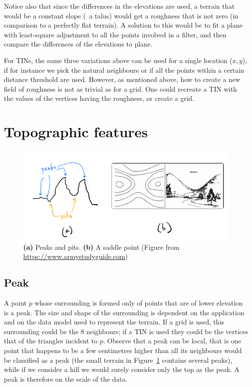 Notice also that since the differences in the elevations are used, a terrain that would be a constant slope (\eg\ a talus) would get a roughness that is not zero (in comparison to a perfectly flat terrain).
A solution to this would be to fit a plane with least-square adjustment to all the points involved in a filter, and then compare the differences of the elevations to plane.

%

For TINs, the same three variations above can be used for a single location ($x,y$), if for instance we pick the natural neighbours or if all the points within a certain distance threshold are used.
However, as mentioned above, how to create a new field of roughness is not as trivial as for a grid.
One could recreate a TIN with the values of the vertices having the roughness, or create a grid.




%
\section{Topographic features}

\begin{figure}
  \centering
  \includegraphics[width=\linewidth]{figs/feature_points}
  \caption{\textbf{(a)} Peaks and pits. \textbf{(b)} A saddle point (Figure from \url{https://www.armystudyguide.com})}%
\label{fig:feature_points}
\end{figure}


\subsection{Peak}
A point $p$ whose surrounding is formed only of points that are of lower elevation is a peak.
The size and shape of the surrounding is dependent on the application and on the data model used to represent the terrain.
If a grid is used, this surrounding could be the 8 neighbours; if a TIN is used they could be the vertices that of the triangles incident to $p$.
Observe that a peak can be local,%
that is one point that happens to be a few centimetres higher than all its neighbours would be classified as a peak (the small terrain in Figure~\ref{fig:feature_points} contains several peaks), while if we consider a hill we would surely consider only the top as the peak.
A peak is therefore on the scale of the data.

